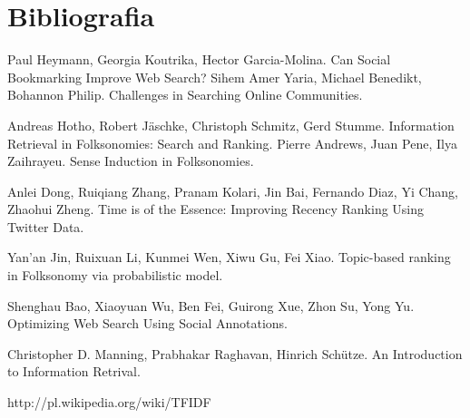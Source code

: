 \chapter{Bibliografia}
Paul Heymann, Georgia Koutrika, Hector Garcia-Molina. Can Social Bookmarking Improve Web Search?
Sihem Amer Yaria, Michael Benedikt, Bohannon Philip. Challenges in Searching Online Communities.

Andreas Hotho, Robert Jäschke, Christoph Schmitz, Gerd Stumme. Information Retrieval in Folksonomies: Search and Ranking.
Pierre Andrews, Juan Pene, Ilya Zaihrayeu. Sense Induction in Folksonomies.

Anlei Dong, Ruiqiang Zhang, Pranam Kolari, Jin Bai, Fernando Diaz, Yi Chang, Zhaohui Zheng. Time is of the Essence: Improving Recency Ranking Using Twitter Data.

Yan’an Jin, Ruixuan Li, Kunmei Wen, Xiwu Gu, Fei Xiao. Topic-based ranking in Folksonomy via probabilistic model.

Shenghau Bao, Xiaoyuan Wu, Ben Fei, Guirong Xue, Zhon Su, Yong Yu. Optimizing Web Search Using Social Annotations.

Christopher D. Manning, Prabhakar Raghavan, Hinrich Schütze. An Introduction to Information Retrival.

http://pl.wikipedia.org/wiki/TFIDF